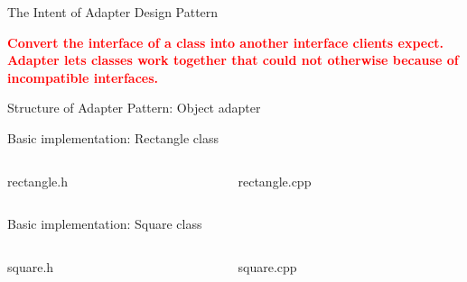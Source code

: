 \documentclass[13pt]{beamer}
\begin{document}
\begin{frame}{The Intent of Adapter Design Pattern}
	\begin{center}
	\textcolor{red}{\textbf{Convert the interface of a class into another interface clients expect. Adapter lets classes work together that could not otherwise because of incompatible interfaces.}}\\
	\end{center}
\end{frame}

\begin{frame}{Structure of Adapter Pattern: Object adapter}
	\begin{center}
	\end{center}
\end{frame}

\begin{frame}{Basic implementation: Rectangle class}
\begin{columns}[T]
\begin{column}{.45\textwidth}
\lstset{basicstyle=\tiny,style=myCustomCppStyle}
rectangle.h

\end{column}

\begin{column}{.45\textwidth}
\lstset{basicstyle=\tiny,style=myCustomCppStyle}
rectangle.cpp

\end{column}
\end{columns}
\end{frame}

\begin{frame}{Basic implementation: Square class}
\begin{columns}[T]
\begin{column}{.45\textwidth}
\lstset{basicstyle=\tiny,style=myCustomCppStyle}
square.h

\end{column}

\begin{column}{.45\textwidth}
\lstset{basicstyle=\tiny,style=myCustomCppStyle}
square.cpp

\end{column}
\end{columns}
\end{frame}
\end{document}

